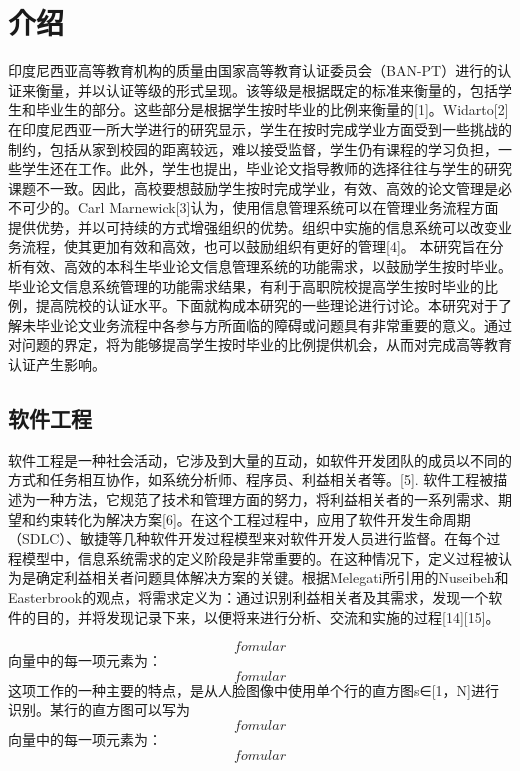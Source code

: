 
\chapter{介绍}
\label{介绍}

印度尼西亚高等教育机构的质量由国家高等教育认证委员会（BAN-PT）进行的认证来衡量，并以认证等级的形式呈现。该等级是根据既定的标准来衡量的，包括学生和毕业生的部分。这些部分是根据学生按时毕业的比例来衡量的[1]。Widarto[2]在印度尼西亚一所大学进行的研究显示，学生在按时完成学业方面受到一些挑战的制约，包括从家到校园的距离较远，难以接受监督，学生仍有课程的学习负担，一些学生还在工作。此外，学生也提出，毕业论文指导教师的选择往往与学生的研究课题不一致。因此，高校要想鼓励学生按时完成学业，有效、高效的论文管理是必不可少的。Carl Marnewick[3]认为，使用信息管理系统可以在管理业务流程方面提供优势，并以可持续的方式增强组织的优势。组织中实施的信息系统可以改变业务流程，使其更加有效和高效，也可以鼓励组织有更好的管理[4]。
本研究旨在分析有效、高效的本科生毕业论文信息管理系统的功能需求，以鼓励学生按时毕业。毕业论文信息系统管理的功能需求结果，有利于高职院校提高学生按时毕业的比例，提高院校的认证水平。下面就构成本研究的一些理论进行讨论。本研究对于了解未毕业论文业务流程中各参与方所面临的障碍或问题具有非常重要的意义。通过对问题的界定，将为能够提高学生按时毕业的比例提供机会，从而对完成高等教育认证产生影响。

\section{软件工程}

软件工程是一种社会活动，它涉及到大量的互动，如软件开发团队的成员以不同的方式和任务相互协作，如系统分析师、程序员、利益相关者等。[5]. 软件工程被描述为一种方法，它规范了技术和管理方面的努力，将利益相关者的一系列需求、期望和约束转化为解决方案[6]。在这个工程过程中，应用了软件开发生命周期（SDLC）、敏捷等几种软件开发过程模型来对软件开发人员进行监督。在每个过程模型中，信息系统需求的定义阶段是非常重要的。在这种情况下，定义过程被认为是确定利益相关者问题具体解决方案的关键。根据Melegati所引用的Nuseibeh和Easterbrook的观点，将需求定义为：通过识别利益相关者及其需求，发现一个软件的目的，并将发现记录下来，以便将来进行分析、交流和实施的过程[14][15]。

\begin{equation}
	fomular
\end{equation}
向量中的每一项元素为：
\begin{equation}
	fomular
\end{equation}
这项工作的一种主要的特点，是从人脸图像中使用单个行的直方图s∈[1，N]进行识别。某行的直方图可以写为
\begin{equation}
	fomular
\end{equation}
向量中的每一项元素为：
\begin{equation}
	fomular
\end{equation}
